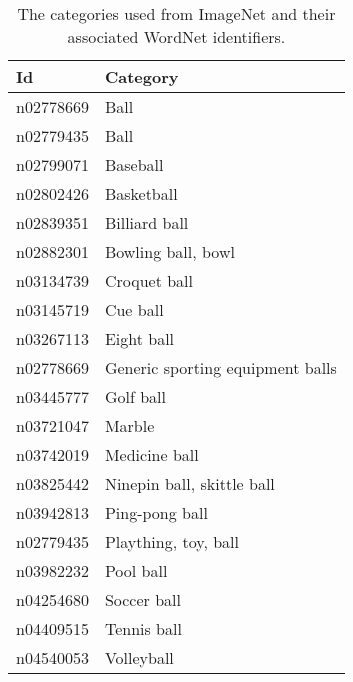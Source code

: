 \documentclass[11pt]{scrartcl}
\begin{document}
{{            \begin{table}[H]
            \centering
            \caption{The categories used from ImageNet and their associated WordNet \citep{fellbaum1998wordnet} identifiers.}
            \label{tab:imagenet}
            \begin{tabularx}{\textwidth}{lX}
                \toprule
                \textbf{Id} & \textbf{Category} \\
                \midrule
                n02778669 & Ball \\
                n02779435 & Ball \\
                n02799071 & Baseball \\
                n02802426 & Basketball \\
                n02839351 & Billiard ball \\
                n02882301 & Bowling ball, bowl \\
                n03134739 & Croquet ball \\
                n03145719 & Cue ball \\
                n03267113 & Eight ball \\
                n02778669 & Generic sporting equipment balls \\
                n03445777 & Golf ball \\
                n03721047 & Marble \\
                n03742019 & Medicine ball \\
                n03825442 & Ninepin ball, skittle ball \\
                n03942813 & Ping-pong ball \\
                n02779435 & Plaything, toy, ball \\
                n03982232 & Pool ball \\
                n04254680 & Soccer ball \\
                n04409515 & Tennis ball \\
                n04540053 & Volleyball \\
                \bottomrule
            \end{tabularx}
            \end{table}


}}
\end{document}
